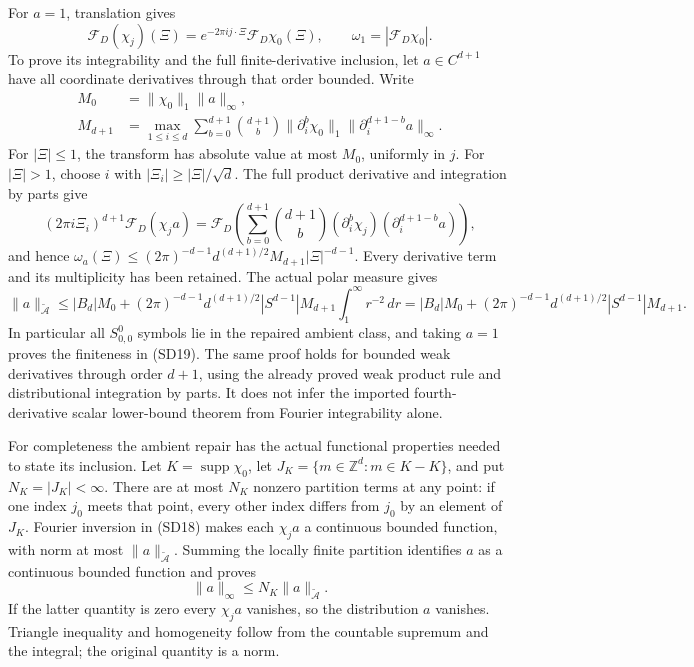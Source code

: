 \documentclass[
  11pt,
]{article}
\begin{document}
For \(a=1\), translation gives \[
 \mathcal F_D(\chi_j)(\Xi)=e^{-2\pi ij\cdot\Xi}\mathcal F_D\chi_0(\Xi),
 \qquad \omega_1=|\mathcal F_D\chi_0|.
 \tag{SD19}
\] To prove its integrability and the full finite-derivative inclusion,
let \(a\in C^{d+1}\) have all coordinate derivatives through that order
bounded. Write \[
 \begin{aligned}
 M_0&=\|\chi_0\|_1\|a\|_\infty,\\
 M_{d+1}&=\max_{1\le i\le d}\sum_{b=0}^{d+1}
 \binom{d+1}{b}\|\partial_i^b\chi_0\|_1
                       \|\partial_i^{d+1-b}a\|_\infty.
 \end{aligned}
 \tag{SD20}
\] For \(|\Xi|\le1\), the transform has absolute value at most \(M_0\),
uniformly in \(j\). For \(|\Xi|>1\), choose \(i\) with
\(|\Xi_i|\ge|\Xi|/\sqrt d\). The full product derivative and integration
by parts give \[
 (2\pi i\Xi_i)^{d+1}\mathcal F_D(\chi_j a)
 =\mathcal F_D\left(\sum_{b=0}^{d+1}\binom{d+1}{b}
                   (\partial_i^b\chi_j)(\partial_i^{d+1-b}a)\right),
 \tag{SD21}
\] and hence
\(\omega_a(\Xi)\le(2\pi)^{-d-1}d^{(d+1)/2}M_{d+1}|\Xi|^{-d-1}\). Every
derivative term and its multiplicity has been retained. The actual polar
measure gives \[
 \|a\|_{\widetilde{\mathcal A}}
 \le |B_d|M_0+(2\pi)^{-d-1}d^{(d+1)/2}
           |S^{d-1}|M_{d+1}\int_1^\infty r^{-2}\,dr
 =|B_d|M_0+(2\pi)^{-d-1}d^{(d+1)/2}|S^{d-1}|M_{d+1}.
 \tag{SD22}
\] In particular all \(S^0_{0,0}\) symbols lie in the repaired ambient
class, and taking \(a=1\) proves the finiteness in (SD19). The same
proof holds for bounded weak derivatives through order \(d+1\), using
the already proved weak product rule and distributional integration by
parts. It does not infer the imported fourth-derivative scalar
lower-bound theorem from Fourier integrability alone.

For completeness the ambient repair has the actual functional properties
needed to state its inclusion. Let \(K=\operatorname{supp}\chi_0\), let
\(J_K=\{m\in\mathbb Z^d:m\in K-K\}\), and put \(N_K=|J_K|<\infty\).
There are at most \(N_K\) nonzero partition terms at any point: if one
index \(j_0\) meets that point, every other index differs from \(j_0\)
by an element of \(J_K\). Fourier inversion in (SD18) makes each
\(\chi_j a\) a continuous bounded function, with norm at most
\(\|a\|_{\widetilde{\mathcal A}}\). Summing the locally finite partition
identifies \(a\) as a continuous bounded function and proves \[
 \|a\|_\infty\le N_K\|a\|_{\widetilde{\mathcal A}}.
 \tag{SD23}
\] If the latter quantity is zero every \(\chi_j a\) vanishes, so the
distribution \(a\) vanishes. Triangle inequality and homogeneity follow
from the countable supremum and the integral; the original quantity is a
norm.
\end{document}
